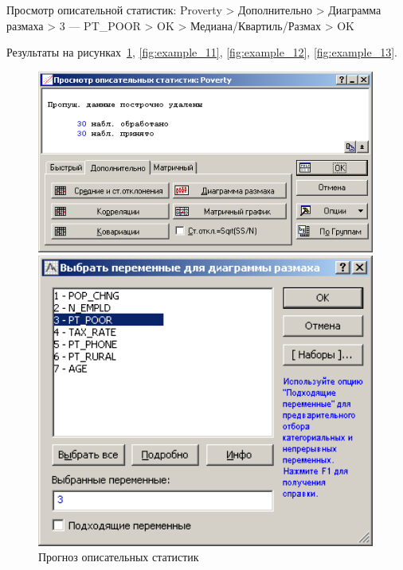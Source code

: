 Просмотр описательной статистик: Proverty
> Дополнительно > Диаграмма размаха > 3 — PT\_POOR > OK > Медиана/Квартиль/Размах > OK

Результаты на рисунках~\ref{fig:example_10}, \ref{fig:example_11}, \ref{fig:example_12}, \ref{fig:example_13}.

\begin{figure}[!h]
  \centering
  \begin{minipage}{0.32\textwidth}
    \centering

    \includegraphics[width=0.99\textwidth]
    {inc/example_10.PNG}

    \caption{Прогноз описательных статистик}
    \label{fig:example_10}
  \end{minipage}
  \begin{minipage}{0.32\textwidth}
    \centering

    \includegraphics[width=0.99\textwidth]
    {inc/example_11.PNG}


\end{minipage}
\end{figure}
